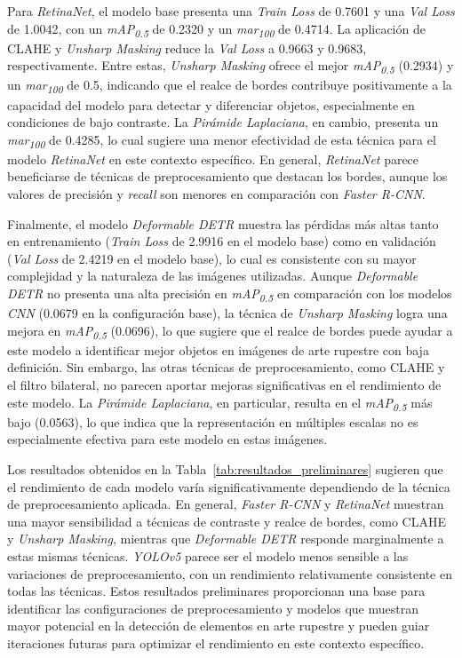 Para \textit{RetinaNet}, el modelo base presenta una \textit{Train Loss} de 0.7601 y una \textit{Val Loss} de 1.0042, con un \textit{mAP\textsubscript{0.5}} de 0.2320 y un \textit{mar\textsubscript{100}} de 0.4714. La aplicación de CLAHE y \textit{Unsharp Masking} reduce la \textit{Val Loss} a 0.9663 y 0.9683, respectivamente. Entre estas, \textit{Unsharp Masking} ofrece el mejor \textit{mAP\textsubscript{0.5}} (0.2934) y un \textit{mar\textsubscript{100}} de 0.5, indicando que el realce de bordes contribuye positivamente a la capacidad del modelo para detectar y diferenciar objetos, especialmente en condiciones de bajo contraste. La \textit{Pirámide Laplaciana}, en cambio, presenta un \textit{mar\textsubscript{100}} de 0.4285, lo cual sugiere una menor efectividad de esta técnica para el modelo \textit{RetinaNet} en este contexto específico. En general, \textit{RetinaNet} parece beneficiarse de técnicas de preprocesamiento que destacan los bordes, aunque los valores de precisión y \textit{recall} son menores en comparación con \textit{Faster R-CNN}.

Finalmente, el modelo \textit{Deformable DETR} muestra las pérdidas más altas tanto en entrenamiento (\textit{Train Loss} de 2.9916 en el modelo base) como en validación (\textit{Val Loss} de 2.4219 en el modelo base), lo cual es consistente con su mayor complejidad y la naturaleza de las imágenes utilizadas. Aunque \textit{Deformable DETR} no presenta una alta precisión en \textit{mAP\textsubscript{0.5}} en comparación con los modelos \textit{CNN} (0.0679 en la configuración base), la técnica de \textit{Unsharp Masking} logra una mejora en \textit{mAP\textsubscript{0.5}} (0.0696), lo que sugiere que el realce de bordes puede ayudar a este modelo a identificar mejor objetos en imágenes de arte rupestre con baja definición. Sin embargo, las otras técnicas de preprocesamiento, como CLAHE y el filtro bilateral, no parecen aportar mejoras significativas en el rendimiento de este modelo. La \textit{Pirámide Laplaciana}, en particular, resulta en el \textit{mAP\textsubscript{0.5}} más bajo (0.0563), lo que indica que la representación en múltiples escalas no es especialmente efectiva para este modelo en estas imágenes.

Los resultados obtenidos en la Tabla~\ref{tab:resultados_preliminares} sugieren que el rendimiento de cada modelo varía significativamente dependiendo de la técnica de preprocesamiento aplicada. En general, \textit{Faster R-CNN} y \textit{RetinaNet} muestran una mayor sensibilidad a técnicas de contraste y realce de bordes, como CLAHE y \textit{Unsharp Masking}, mientras que \textit{Deformable DETR} responde marginalmente a estas mismas técnicas. \textit{YOLOv5} parece ser el modelo menos sensible a las variaciones de preprocesamiento, con un rendimiento relativamente consistente en todas las técnicas. Estos resultados preliminares proporcionan una base para identificar las configuraciones de preprocesamiento y modelos que muestran mayor potencial en la detección de elementos en arte rupestre y pueden guiar iteraciones futuras para optimizar el rendimiento en este contexto específico.

